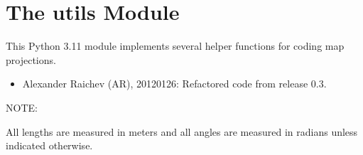 \documentclass[a4paper,12ptopenany,oneside,english]{sphinxmanual}
\begin{document}
\sphinxstepscope


\chapter{The utils Module}
\label{\detokenize{utils:module-rhealpixdggs.utils}}\label{\detokenize{utils:the-utils-module}}\label{\detokenize{utils::doc}}
\sphinxAtStartPar
This Python 3.11 module implements several helper functions for coding map projections.
\begin{itemize}
\item {} 
\sphinxAtStartPar
Alexander Raichev (AR), 2012\sphinxhyphen{}01\sphinxhyphen{}26: Refactored code from release 0.3.

\end{itemize}

\sphinxAtStartPar
NOTE:

\sphinxAtStartPar
All lengths are measured in meters and all angles are measured in radians
unless indicated otherwise.
\end{document}
